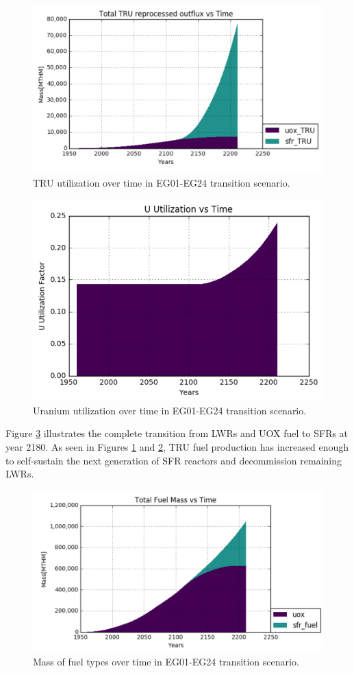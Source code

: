 \begin{figure} [h]
	\includegraphics[width=\linewidth]{images/transition-TRUutil}
	\caption{TRU utilization over time in EG01-EG24 transition scenario.}
	\label{fig:TRU-util}
\end{figure}

\begin{figure} [h]
	\includegraphics[width=0.8\linewidth]{images/u-util}
	\caption{Uranium utilization over time in EG01-EG24 transition scenario.}
	\label{fig:u-util}
\end{figure}

Figure \ref{fig:fuel-mass} illustrates the complete transition from LWRs and UOX fuel to SFRs at year 2180. As seen in Figures \ref{fig:TRU-util} and \ref{fig:u-util}, TRU fuel
production has increased enough to self-sustain the next generation of SFR reactors and decommission remaining LWRs.

\begin{figure}[h]
	\includegraphics[width=\linewidth]{images/transition-fuelmass}
	\caption{Mass of fuel types over time in EG01-EG24 transition scenario.}
	\label{fig:fuel-mass}
\end{figure}